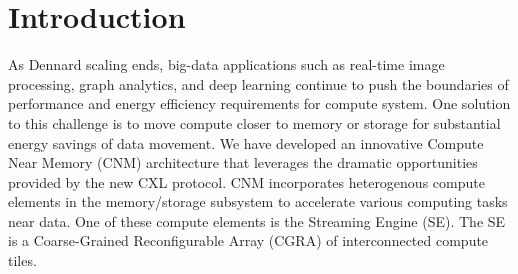 \documentclass[sigplan,screen]{acmart}
\begin{document}



\maketitle

\section{Introduction}
As Dennard scaling ends, big-data applications such as real-time image processing, graph analytics, and deep learning continue to push the boundaries of performance and energy efficiency requirements for compute system. 
One solution to this challenge is to move compute closer to memory or storage for substantial energy savings of data movement. 
We have developed an innovative Compute Near Memory (CNM) architecture that leverages the dramatic opportunities provided by the new CXL protocol. 
CNM incorporates heterogenous compute elements in the memory/storage subsystem to accelerate various computing tasks near data. 
One of these compute elements is the Streaming Engine (SE). The SE is a Coarse-Grained Reconfigurable Array (CGRA) of interconnected compute tiles.  
\end{document}
